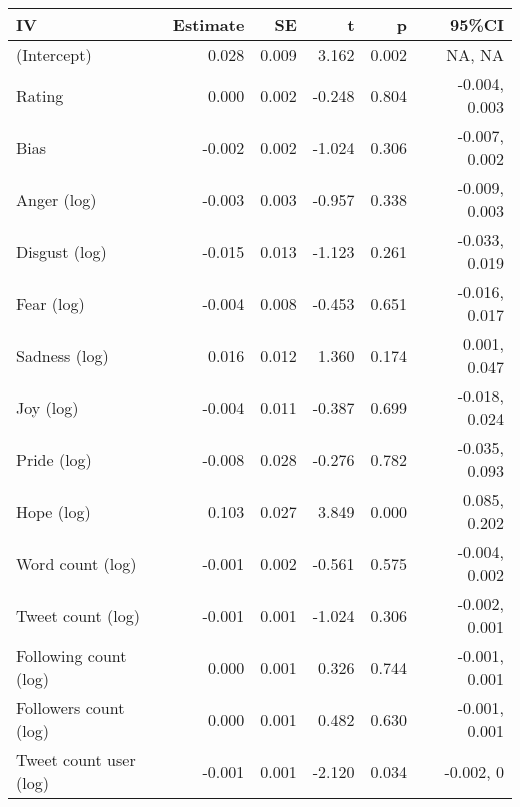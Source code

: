 
\begin{tabular}{lrrrrr}
\toprule
IV & Estimate & SE & t & p & 95\%CI\\
\midrule
(Intercept) & 0.028 & 0.009 & 3.162 & 0.002 & NA, NA\\
Rating & 0.000 & 0.002 & -0.248 & 0.804 & -0.004, 0.003\\
Bias & -0.002 & 0.002 & -1.024 & 0.306 & -0.007, 0.002\\
Anger (log) & -0.003 & 0.003 & -0.957 & 0.338 & -0.009, 0.003\\
Disgust (log) & -0.015 & 0.013 & -1.123 & 0.261 & -0.033, 0.019\\
Fear (log) & -0.004 & 0.008 & -0.453 & 0.651 & -0.016, 0.017\\
Sadness (log) & 0.016 & 0.012 & 1.360 & 0.174 & 0.001, 0.047\\
Joy (log) & -0.004 & 0.011 & -0.387 & 0.699 & -0.018, 0.024\\
Pride (log) & -0.008 & 0.028 & -0.276 & 0.782 & -0.035, 0.093\\
Hope (log) & 0.103 & 0.027 & 3.849 & 0.000 & 0.085, 0.202\\
Word count (log) & -0.001 & 0.002 & -0.561 & 0.575 & -0.004, 0.002\\
Tweet count (log) & -0.001 & 0.001 & -1.024 & 0.306 & -0.002, 0.001\\
Following count (log) & 0.000 & 0.001 & 0.326 & 0.744 & -0.001, 0.001\\
Followers count (log) & 0.000 & 0.001 & 0.482 & 0.630 & -0.001, 0.001\\
Tweet count user (log) & -0.001 & 0.001 & -2.120 & 0.034 & -0.002, 0\\
\bottomrule
\end{tabular}
